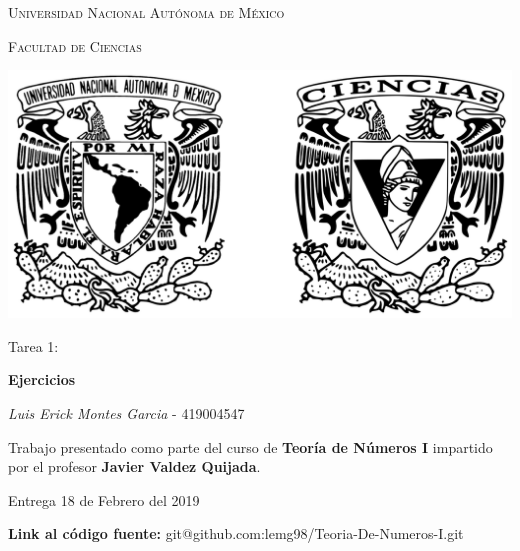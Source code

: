 \documentclass[10pt,letterpaper,fleqn]{article}
\begin{document}
\begin{titlepage}
    \centering

    {\scshape\LARGE Universidad Nacional Autónoma de México \par}

    \vspace{1cm}
    {\scshape\Large Facultad de Ciencias\par}
    \vspace{1.5cm}

    \begin{center}
        \includegraphics[scale=.1]{assets/img/logo.png}
    \end{center}

    \vspace{.8 cm}

    {\LARGE Tarea 1: \par}
    {\huge\bfseries Ejercicios \par}

    \vspace{0.5cm}
    \large{\itshape{Luis Erick Montes Garcia}} \small{ - 419004547}

    \vfill

    Trabajo presentado como parte del curso de
    \textbf{Teoría de Números I}
    impartido por el profesor \textbf{Javier Valdez Quijada}. \par
    \vspace{0.1cm}
    {\large Entrega 18 de Febrero del 2019 \par}
    \footnotesize{\textbf{Link al código fuente:} git@github.com:lemg98/Teoria-De-Numeros-I.git}
\end{titlepage}

        
\end{document}
